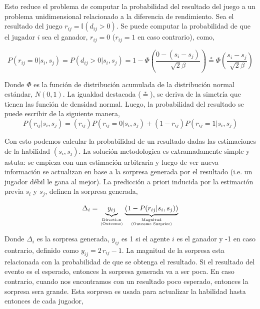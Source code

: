 \documentclass[11pt,twoside,spanish]{report} %
\newcommand\hfrac[2]{\genfrac{}{}{0pt}{}{#1}{#2}}
\begin{document}
Esto reduce el problema de computar la probabilidad del resultado del juego a un problema unidimensional relacionado a la diferencia de rendimiento.
Sea el resultado del juego $r_{ij} = \mathbb{I}(d_{ij}>0)$.
Se puede computar la probabilidad de que el jugador $i$ sea el ganador, $r_{ij} = 0$ ($r_{ij} = 1$ en caso contrario), como,

\begin{equation}
P(r_{ij}=0|s_i,s_j) = P(d_{ij} > 0 | s_i, s_j) = 1 - \Phi \left( \frac{0 - (s_i - s_j)}{\sqrt{2}\beta} \right) \overset{*}{=} \Phi \left(\frac{s_i - s_j}{\sqrt{2}\beta} \right)
\end{equation}

Donde $\Phi$ es la funci\'on de distribuci\'on acumulada de la distribuci\'on normal est\'andar, $N(0, 1)$.
La igualdad destacada ($\overset{*}{=}$), se deriva de la simetr\'ia que tienen las funci\'on de densidad normal.
Luego, la probabilidad del resultado se puede escribir de la siguiente manera,
\begin{equation}
P(r_{ij}|s_i,s_j) = (r_{ij}) P(r_{ij}=0|s_i,s_j) +  (1-r_{ij})P(r_{ij}=1|s_i,s_j)
\end{equation}

Con esto podemos calcular la probabilidad de un resultado dadas las estimaciones de la habilidad $ (s_i, s_j) $.
La soluci\'on metodologica es extramadamente simple y astuta: se empieza con una estimaci\'on arbitraria y luego de ver nueva informaci\'on se actualizan en base a la sorpresa generada por el resultado (i.e. un jugador d\'ebil le gana al mejor).
La predicci\'on a priori inducida por la estimaci\'on previa $s_i$ y $s_j$, definen la sorpresa generada,

\begin{equation}
\Delta_i = \underbrace{y_{ij}}_{\hfrac{\text{Direction}}{\text{(Outcome)}}}\underbrace{\left(1-P(r_{ij}|s_i,s_j)\right)}_{\hfrac{\text{Magnitud}}{\text{(Outcome Surprise)}}}
\end{equation}

Donde $\Delta_i$ es la sorpresa generada, $y_{ij}$ es 1 si el agente $i$ es el ganador y -1 en caso contrario, definido como $y_{ij} =  2\,r_{ij} - 1$.
La magnitud de la sorpresa esta relacionada con la probabilidad de que se obtenga el resultado.
Si el resultado del evento es el esperado, entonces la sorpresa generada va a ser poca.
En caso contrario, cuando nos encontramos con un resultado poco esperado, entonces la sorpresa sera grande.
Esta sorpresa es usada para actualizar la habilidad hasta entonces de cada jugador,
\end{document}
